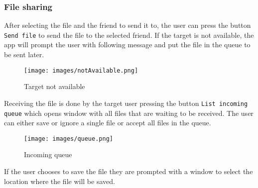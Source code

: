 \subsubsection{File sharing}
After selecting the file and the friend to send it to, the user can press the button \texttt{Send file} to send the file to the selected friend.
If the target is not available, the app will prompt the user with following message and put the file in the queue to be sent later.
\begin{figure}[h]
    \centering
    \texttt{[image: images/notAvailable.png]}
    \caption{Target not available}
    \label{fig:notAvail}
\end{figure}

Receiving the file is done by the target user pressing the button \texttt{List incoming queue} which opens window with all files that are waiting to be
received. The user can either save or ignore a single file or accept all files in the queue.\\

\begin{figure}[ht]
    \centering
    \texttt{[image: images/queue.png]}
    \caption{Incoming queue}
    \label{fig:inQueue}
\end{figure}

If the user chooses to save the file they are prompted with a window to select the location where the file will be saved.\\